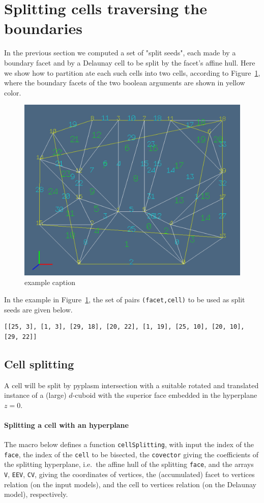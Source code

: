 \documentclass[11pt,oneside]{article}	%
\begin{document}
\section{Splitting cells traversing the boundaries}
\label{sec:crossing}
In the previous section we computed a set of "split seeds", each made by a boundary facet and by a Delaunay cell to be split by the facet's affine hull. Here we show how to partition ate each such cells into two cells, according to Figure~\ref{fig:splitting}, where the boundary facets of the two boolean arguments are shown in yellow color.

\begin{figure}[htbp] %
   \centering
   \includegraphics[width=0.6\linewidth]{images/splitting} 
   \caption{example caption}
   \label{fig:splitting}
\end{figure}

In the example in Figure~\ref{fig:splitting}, the set of pairs \texttt{(facet,cell)} to be used as split seeds are given below.
{\small
\begin{verbatim}
[[25, 3], [1, 3], [29, 18], [20, 22], [1, 19], [25, 10], [20, 10], [29, 22]]
\end{verbatim}}

\subsection{Cell splitting}

A cell will be split by pyplasm intersection with a suitable rotated and translated instance of a (large) $d$-cuboid with the superior face embedded in the hyperplane $z=0$.

\paragraph{Splitting a cell with an hyperplane}
The macro below defines a function \texttt{cellSplitting}, with input the index of the \texttt{face}, the index of the \texttt{cell} to be bisected, the \texttt{covector} giving the coefficients of the splitting hyperplane, i.e.~the affine hull of the splitting \texttt{face}, and the arrays \texttt{V}, \texttt{EEV}, \texttt{CV}, giving the coordinates of vertices, the (accumulated) facet to vertices relation (on the input models), and the cell to vertices relation (on the Delaunay model), respectively. 
\end{document}

